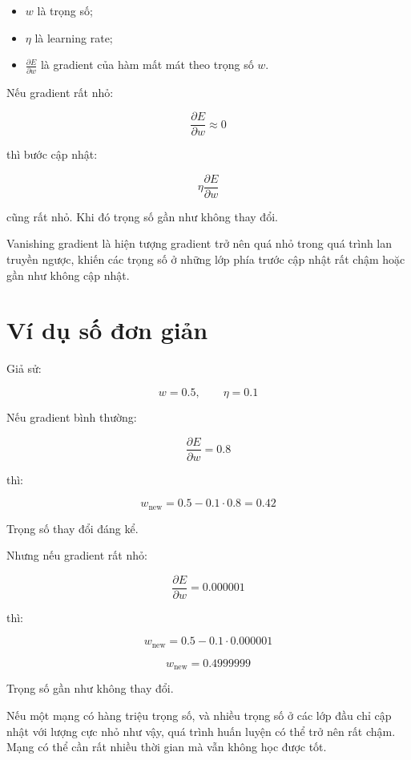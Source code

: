 \documentclass[12pt,a4paper]{report}
\begin{document}
\begin{itemize}
    \item $w$ là trọng số;
    \item $\eta$ là learning rate;
    \item $\frac{\partial E}{\partial w}$ là gradient của hàm mất mát theo trọng số $w$.
\end{itemize}

Nếu gradient rất nhỏ:

\[
    \frac{\partial E}{\partial w} \approx 0
\]

thì bước cập nhật:

\[
    \eta \frac{\partial E}{\partial w}
\]

cũng rất nhỏ. Khi đó trọng số gần như không thay đổi.

\begin{ghinho}
Vanishing gradient là hiện tượng gradient trở nên quá nhỏ trong quá trình lan truyền ngược, khiến các trọng số ở những lớp phía trước cập nhật rất chậm hoặc gần như không cập nhật.
\end{ghinho}

\section{Ví dụ số đơn giản}

Giả sử:

\[
    w = 0.5,\qquad \eta = 0.1
\]

Nếu gradient bình thường:

\[
    \frac{\partial E}{\partial w}=0.8
\]

thì:

\[
    w_{\text{new}}
    =
    0.5 - 0.1 \cdot 0.8
    =
    0.42
\]

Trọng số thay đổi đáng kể.

Nhưng nếu gradient rất nhỏ:

\[
    \frac{\partial E}{\partial w}=0.000001
\]

thì:

\[
    w_{\text{new}}
    =
    0.5 - 0.1 \cdot 0.000001
\]

\[
    w_{\text{new}}
    =
    0.4999999
\]

Trọng số gần như không thay đổi.

\begin{vidu}
Nếu một mạng có hàng triệu trọng số, và nhiều trọng số ở các lớp đầu chỉ cập nhật với lượng cực nhỏ như vậy, quá trình huấn luyện có thể trở nên rất chậm. Mạng có thể cần rất nhiều thời gian mà vẫn không học được tốt.
\end{vidu}
\end{document}
